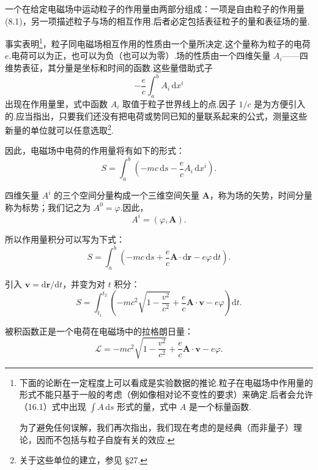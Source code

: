 一个在给定电磁场中运动粒子的作用量由两部分组成：一项是自由粒子的作用量 (8.1)，另一项描述粒子与场的相互作用.后者必定包括表征粒子的量和表征场的量.

事实表明\footnote{下面的论断在一定程度上可以看成是实验数据的推论.粒子在电磁场中作用量的形式不能只基于一般的考虑（例如像相对论不变性的要求）来确定.后者会允许（16.1）式中出现 $\int A\,\mathrm{d}s$ 形式的量，式中 $A$ 是一个标量函数.
\par 为了避免任何误解，我们再次指出，我们现在考虑的是经典（而非量子）理论，因而不包括与粒子自旋有关的效应.}，粒子同电磁场相互作用的性质由一个量所决定.这个量称为粒子的电荷 $e$.电荷可以为正，也可以为负（也可以为零）.场的性质由一个四维矢量 $A_i$——四维势表征，其分量是坐标和时间的函数.这些量借助式子
\begin{equation*}
  -\frac{e}{c}\int_a^b A_i\,\mathrm{d}x^i
\end{equation*}
出现在作用量里，式中函数 $A_i$ 取值于粒子世界线上的点.因子 $1/c$ 是为方便引入的.应当指出，只要我们还没有把电荷或势同已知的量联系起来的公式，测量这些新量的单位就可以任意选取\footnote{关于这些单位的建立，参见 §27.}.

因此，电磁场中电荷的作用量将有如下的形式：
\begin{equation}
  S=\int_a^b\left(-mc\,\mathrm{d}s-\frac{e}{c}A_i\,\mathrm{d}x^i\right).
\end{equation}

四维矢量 $A^i$ 的三个空间分量构成一个三维空间矢量 $\boldsymbol{A}$，称为场的矢势，时间分量称为标势；我们记之为 $A^0=\varphi$.因此，
\begin{equation}
  A^i=(\varphi,\boldsymbol{A}).
\end{equation}

所以作用量积分可以写为下式：
\begin{equation*}
  S=\int_a^b\left(-mc\,\mathrm{d}s+\frac{e}{c}\boldsymbol{A}\cdot\mathrm{d}\boldsymbol{r}-e\varphi\,\mathrm{d}t\right).
\end{equation*}

引入 $\boldsymbol{v}=\mathrm{d}\boldsymbol{r}/\mathrm{d}t$，并变为对 $t$ 积分：
\begin{equation}
  S=\int_{t_1}^{t_2}\left(-mc^2\sqrt{1-\frac{v^2}{c^2}}
  +\frac{e}{c}\boldsymbol{A}\cdot\boldsymbol{v}-e\varphi\right)\mathrm{d}t.
\end{equation}

被积函数正是一个电荷在电磁场中的拉格朗日量：
\begin{equation}
  \mathcal{L}=-mc^2\sqrt{1-\frac{v^2}{c^2}}
  +\frac{e}{c}\boldsymbol{A}\cdot\boldsymbol{v}-e\varphi.
\end{equation}


